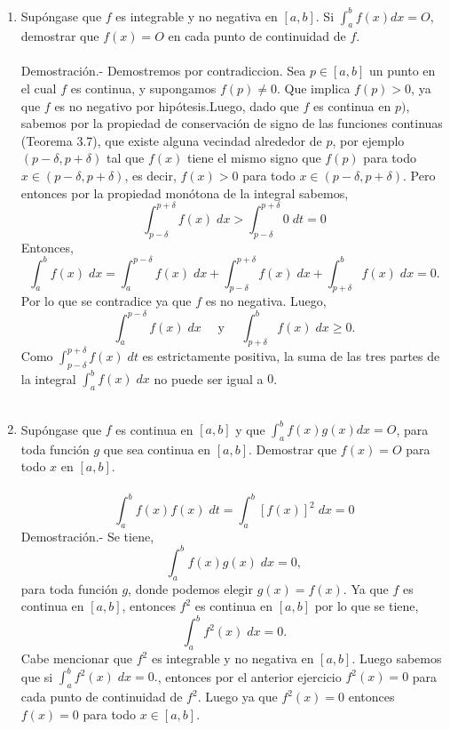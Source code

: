 \begin{enumerate}[\bfseries 1.]
    \item Supóngase que $f$ es integrable y no negativa en $[a, b]$. Si $\int_a^b f(x) dx = O$, demostrar que $f(x) = O$ en cada punto de continuidad de $f$.\\\\
	Demostración.-\; Demostremos por contradiccion. Sea $p \in [a, b]$ un punto en el cual $f$ es continua, y supongamos $f(p) \neq 0$. Que implica $f(p) > 0$, ya que $f$ es no negativo por hipótesis.Luego, dado que $f$ es continua en $p)$, sabemos por la propiedad de conservación de signo de las funciones continuas (Teorema 3.7), que existe alguna vecindad alrededor de $p$, por ejemplo $(p - \delta, p + \delta)$ tal que $f(x)$ tiene el mismo signo que $f(p)$ para todo $x \in (p - \delta, p + \delta)$, es decir, $f(x) > 0$ para todo $x \in (p - \delta, p + \delta)$. Pero entonces por la propiedad monótona de la integral sabemos,
	$$\int_{p-\delta}^{p+\delta}f(x)\; dx > \int_{p-\delta}^{p+\delta} 0\; dt = 0$$
	Entonces,
	$$\int_a^b f(x)\; dx = \int_{a}^{p-\delta}f(x)\; dx+\int_{p-\delta}^{p+\delta} f(x)\; dx + \int_{p+\delta}^b f(x)\; dx=0.$$
	Por lo que se contradice ya que $f$ es no negativa. Luego,
	$$\int_a^{p-\delta}f(x)\; dx\quad \mbox{ y }\quad \int_{p+\delta}^b f(x)\; dx \geq 0.$$
	Como $\int_{p-\delta}^{p+\delta}f(x)\; dt$ es estrictamente positiva, la suma de las tres partes de la integral $\int_a^b f(x)\; dx$ no puede ser igual a $0$.\\\\

    \item Supóngase que $f$ es continua en $[a, b]$ y que $\int_a^b f(x)g(x) dx = O$, para toda función $g$ que sea continua en $[a, b]$. Demostrar que $f(x) = O$ para todo $x$ en $[a, b].$\\\\
    $$\int_a^b f(x) f(x)\; dt = \int_a^b \left[f(x)\right]^2\; dx=0$$
	Demostración.-\; Se tiene,
	$$\int_a^b f(x)g(x)\; dx = 0,$$
	para toda función $g$, donde podemos elegir $g(x)=f(x)$. Ya que $f$ es continua en $[a, b]$, entonces $f^2$ es continua en $[a,b]$ por lo que se tiene,
	$$\int_a^b f^2(x)\; dx = 0.$$
	Cabe mencionar que $f^2$ es integrable y no negativa en $[a,b]$. Luego sabemos que si $\int_a^b f^2(x)\; dx = 0.$, entonces por el anterior ejercicio $f^2(x)=0$ para cada punto de continuidad de $f^2$. Luego ya que $f^2(x)=0$ entonces $f(x)=0$ para todo $x\in [a,b]$.\\\\



\end{enumerate}


